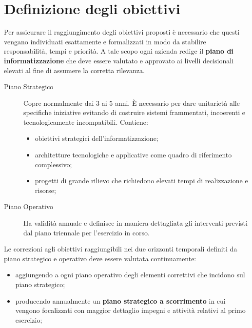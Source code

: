 \section{Definizione degli obiettivi}\label{sec:definizione_degli_obiettivi} %
Per assicurare il raggiungimento degli obiettivi proposti è necessario che questi vengano individuati esattamente e formalizzati in modo da stabilire responsabilità, tempi e priorità.
A tale scopo ogni azienda redige il \textbf{piano di informatizzazione} che deve essere valutato e approvato ai livelli decisionali elevati al fine di assumere la corretta rilevanza.
\begin{description}
    \item[Piano Strategico] Copre normalmente dai 3 ai 5 anni.
        È necessario per dare unitarietà alle specifiche iniziative evitando di costruire sistemi frammentati, incoerenti e tecnologicamente incompatibili.
        Contiene:
        \begin{itemize}
            \item obiettivi strategici dell'informatizzazione;
            \item architetture tecnologiche e applicative come quadro di riferimento complessivo;
            \item progetti di grande rilievo che richiedono elevati tempi di realizzazione e risorse;
        \end{itemize}
    \item[Piano Operativo] Ha validità annuale e definisce in maniera dettagliata gli interventi previsti dal piano triennale per l'esercizio in corso.
\end{description}
Le correzioni agli obiettivi raggiungibili nei due orizzonti temporali definiti da piano strategico e operativo deve essere valutata continuamente:
\begin{itemize}
    \item aggiungendo a ogni piano operativo degli elementi correttivi che incidono sul piano strategico;
    \item producendo annualmente un \textbf{piano strategico a scorrimento} in cui vengono focalizzati con maggior dettaglio impegni e attività relativi al primo esercizio;
\end{itemize}
%
